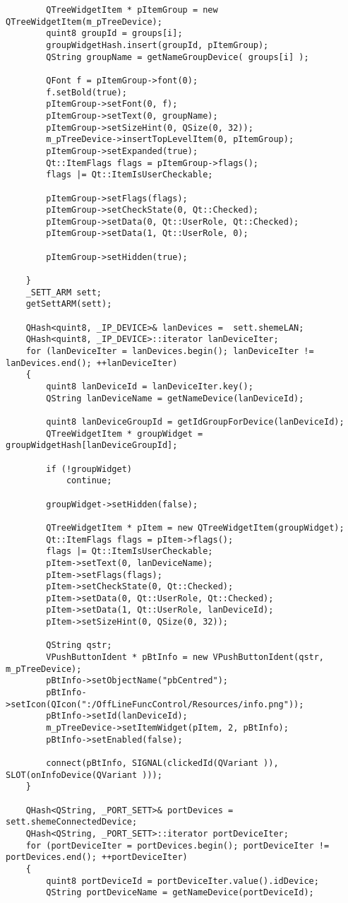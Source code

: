 \begin{verbatim}
		QTreeWidgetItem * pItemGroup = new QTreeWidgetItem(m_pTreeDevice);
		quint8 groupId = groups[i];
		groupWidgetHash.insert(groupId, pItemGroup);
		QString groupName = getNameGroupDevice( groups[i] );

		QFont f = pItemGroup->font(0);
		f.setBold(true);
		pItemGroup->setFont(0, f);
		pItemGroup->setText(0, groupName);
		pItemGroup->setSizeHint(0, QSize(0, 32));
		m_pTreeDevice->insertTopLevelItem(0, pItemGroup);
		pItemGroup->setExpanded(true);
		Qt::ItemFlags flags = pItemGroup->flags();
		flags |= Qt::ItemIsUserCheckable;

		pItemGroup->setFlags(flags);
		pItemGroup->setCheckState(0, Qt::Checked);
		pItemGroup->setData(0, Qt::UserRole, Qt::Checked);
		pItemGroup->setData(1, Qt::UserRole, 0);

		pItemGroup->setHidden(true);

	}
	_SETT_ARM sett;
	getSettARM(sett);

	QHash<quint8, _IP_DEVICE>& lanDevices =  sett.shemeLAN;
	QHash<quint8, _IP_DEVICE>::iterator lanDeviceIter;
	for (lanDeviceIter = lanDevices.begin(); lanDeviceIter != lanDevices.end(); ++lanDeviceIter)
	{
		quint8 lanDeviceId = lanDeviceIter.key();
		QString lanDeviceName = getNameDevice(lanDeviceId);

		quint8 lanDeviceGroupId = getIdGroupForDevice(lanDeviceId);
		QTreeWidgetItem * groupWidget = groupWidgetHash[lanDeviceGroupId];

		if (!groupWidget)
			continue;

		groupWidget->setHidden(false);

		QTreeWidgetItem * pItem = new QTreeWidgetItem(groupWidget);
		Qt::ItemFlags flags = pItem->flags();
		flags |= Qt::ItemIsUserCheckable;
		pItem->setText(0, lanDeviceName);
		pItem->setFlags(flags);
		pItem->setCheckState(0, Qt::Checked);
		pItem->setData(0, Qt::UserRole, Qt::Checked);
		pItem->setData(1, Qt::UserRole, lanDeviceId);
		pItem->setSizeHint(0, QSize(0, 32));

		QString qstr;
		VPushButtonIdent * pBtInfo = new VPushButtonIdent(qstr, m_pTreeDevice);
		pBtInfo->setObjectName("pbCentred");
		pBtInfo->setIcon(QIcon(":/OffLineFuncControl/Resources/info.png"));
		pBtInfo->setId(lanDeviceId);
		m_pTreeDevice->setItemWidget(pItem, 2, pBtInfo);
		pBtInfo->setEnabled(false);

		connect(pBtInfo, SIGNAL(clickedId(QVariant )), SLOT(onInfoDevice(QVariant )));
	}

	QHash<QString, _PORT_SETT>& portDevices = sett.shemeConnectedDevice;
	QHash<QString, _PORT_SETT>::iterator portDeviceIter;
	for (portDeviceIter = portDevices.begin(); portDeviceIter != portDevices.end(); ++portDeviceIter)
	{
		quint8 portDeviceId = portDeviceIter.value().idDevice;
		QString portDeviceName = getNameDevice(portDeviceId);


\end{verbatim}
